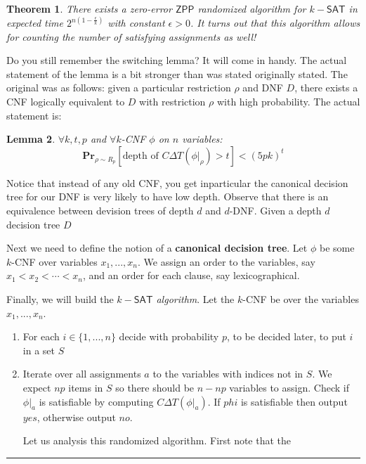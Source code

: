 \documentclass[twoside]{article}
\newcounter{lecnum}
\newtheorem{theorem}{Theorem}[lecnum]
\newtheorem{lemma}[theorem]{Lemma}
\newenvironment{proof}{{\bf Proof:}}{\hfill\rule{2mm}{2mm}}
\def\Pr{\mathbf{Pr}}
\def\ZPP{\mathsf{ZPP}}
\def\SAT{\mathsf{SAT}}
\begin{document}
\begin{theorem}
There exists a zero-error $\ZPP$ randomized algorithm for $k-\SAT$ in expected time $2^{n(1 - \frac{\epsilon}{k})}$ with constant $\epsilon > 0$. It turns out that this algorithm allows for counting the number of satisfying assignments as well! 
\end{theorem}
\begin{proof}
Do you still remember the switching lemma? It will come in handy. The actual statement of the lemma is a bit stronger than was stated originally stated. The original was as follows: given a particular restriction $\rho$ and DNF $D$, there exists a CNF logically equivalent to $D$ with restriction $\rho$ with high probability. The actual statement is:

\begin{lemma}
$\forall k, t, p$ and $\forall k$-CNF $\phi$ on $n$ variables:
\[\Pr_{\rho \sim R_p}[\mbox{depth of } C\Delta T(\phi |_{\rho}) > t ] < (5pk)^t\]
\end{lemma}

Notice that instead of any old CNF, you get inparticular the canonical decision tree for our DNF is very likely to have low depth. Observe that there is an equivalence between devision trees of depth $d$ and $d$-DNF. Given a depth $d$ decision tree $D$ 

Next we need to define the notion of a \textbf{canonical decision tree}. Let $\phi$ be some $k$-CNF over variables $x_1, ..., x_n$. We assign an order to the variables, say $x_1 < x_2 < \cdots < x_n$, and an order for each clause, say lexicographical. 

Finally, we will build the \emph{$k-\SAT$ algorithm}. Let the $k$-CNF be over the variables $x_1, ..., x_n$. 
\begin{enumerate}
\item For each $i \in \{1, ..., n\}$ decide with probability $p$, to be decided later, to put $i$ in a set $S$
\item Iterate over all assignments $a$ to the variables with indices not in $S$. We expect $np$ items in $S$ so there should be $n - np$ variables to assign. Check if $\phi | _{a}$ is satisfiable by computing $C\Delta T(\phi |_a)$. If $phi$ is satisfiable then output $yes$, otherwise output $no$. 

Let us analysis this randomized algorithm. First note that the 
\end{enumerate}
\end{proof}
\end{document}
